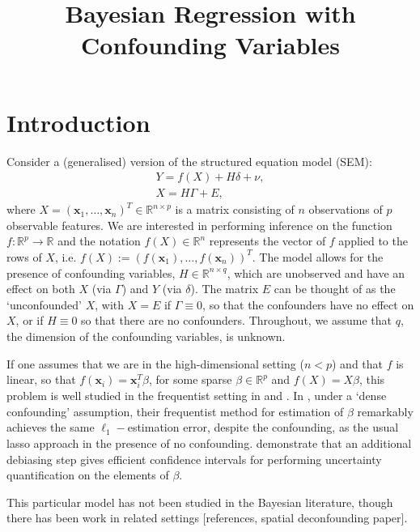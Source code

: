 \documentclass[11pt]{article}
\title{Bayesian Regression with Confounding Variables}
\newcommand{\R}{\mathbb{R}}
\begin{document}
\maketitle
\section{Introduction}
Consider a (generalised) version of the structured equation model (SEM):
\begin{align}
	Y = f(X) + H \delta + \nu, \label{eq:general_SEM}\\
	X = H\Gamma + E, \nonumber
\end{align}
where $X = (\mathbf{x}_1, \dots, \mathbf{x}_n )^T \in \R^{n \times p}$ is a matrix consisting of $n$ observations of $p$ observable features. We are interested in performing inference on the function $f : \R^p \rightarrow \R$ and the notation $f(X) \in \R^n$ represents the vector of $f$ applied to the rows of $X$, i.e. $f(X) := (f(\mathbf{x}_1), \dots, f(\mathbf{x}_n))^T $. The model allows for the presence of confounding variables, $H \in \R^{n \times q}$, which are unobserved and have an effect on both $X$ (via $\Gamma$) and $Y$ (via $\delta$). The matrix $E$ can be thought of as the `unconfounded' $X$, with $X = E$ if $\Gamma \equiv 0$, so that the confounders have no effect on $X$, or if $H \equiv 0$ so that there are no confounders. Throughout, we assume that $q$, the dimension of the confounding variables, is unknown.

If one assumes that we are in the high-dimensional setting ($n < p$) and that $f$ is linear, so that $f(\mathbf{x}_i) = \mathbf{x}_i^T \beta$, for some sparse $\beta \in \R^p$ and $f(X) = X \beta$, this problem is well studied in the frequentist setting in \cite{CBM2020} and \cite{GCB22}. In \cite{CBM2020}, under a `dense confounding' assumption, their frequentist method for estimation of $\beta$ remarkably achieves the same $\ell_1-$estimation error, despite the confounding, as the usual lasso approach in the presence of no confounding. \cite{GCB22} demonstrate that an additional debiasing step gives efficient confidence intervals for performing uncertainty quantification on the elements of $\beta$.

This particular model has not been studied in the Bayesian literature, though there has been work in related settings {\color{ared} [references, spatial deconfounding paper]}. 
\end{document}
